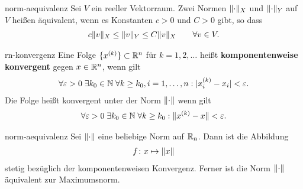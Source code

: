 \begin{Definition}{norm-aequivalenz}
  Sei $V$ ein reeller Vektorraum. Zwei Normen $\lVert\cdot\rVert_X$ und
  $\lVert\cdot\rVert_Y$ auf $V$ heißen äquivalent, wenn es Konstanten $c>0$
  und $C>0$ gibt, so dass
  \begin{gather}
    c \lVert v\rVert_X \le \lVert v\rVert_Y \le C \lVert v\rVert_X
    \qquad\forall v\in V.
  \end{gather}
\end{Definition}

\begin{Definition}{rn-konvergenz}
  Eine Folge $\{x^{(k)}\}\subset \mathbb R^n$ für $k=1,2,\dots$ heißt
  \textbf{komponentenweise konvergent} gegen $x\in \mathbb R^n$, wenn gilt
  \begin{gather}
    \forall \varepsilon>0\;
    \exists k_0\in \mathbb N\;
    \forall k\ge k_0, i=1,\dots,n
    : \lvert x^{(k)}_i - x_i\rvert < \varepsilon.
  \end{gather}
  Die Folge heißt konvergent unter der Norm $\lVert\cdot\rVert$ wenn gilt
  \begin{gather}
    \forall \varepsilon>0\;
    \exists k_0\in \mathbb N\;
    \forall k\ge k_0
    : \lVert x^{(k)} - x\rVert < \varepsilon.
  \end{gather}
\end{Definition}

\begin{Lemma}{norm-aequivalenz}
  Sei $\lVert\cdot\rVert$ eine beliebige Norm auf $\mathbb R_n$. Dann ist die Abbildung
  \begin{gather}
    f\colon x \mapsto \lVert x\rVert
  \end{gather}
  stetig bezüglich der komponentenweisen Konvergenz. Ferner ist die
  Norm $\lVert\cdot\rVert$ äquivalent zur Maximumsnorm.
\end{Lemma}

